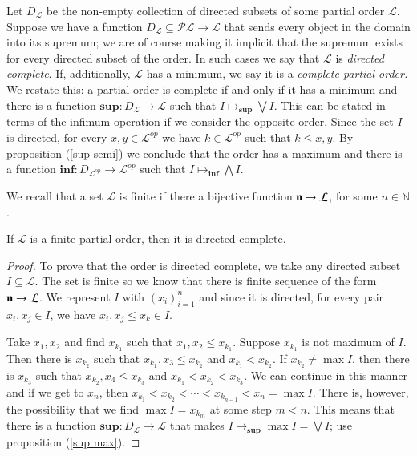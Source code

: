 \documentclass [12pt]{book}
\begin{document}
 Let $D_\mathcal L$ be the non-empty collection of directed subsets of some partial order $\mathcal L$. Suppose we have a function $D_\mathcal L\subseteq\mathcal{PL}\rightarrow\mathcal L$ that sends every object in the domain into its supremum; we are of course making it implicit that the supremum exists for every directed subset of the order. In such cases we say that $\mathcal L$ is \textit{directed complete}. If, additionally, $\mathcal L$ has a minimum, we say it is a \textit{complete partial order.} We restate this: a partial order is complete if and only if it has a minimum and there is a function $\textbf{sup}:D_\mathcal L\rightarrow\mathcal L$ such that $I \mapsto_\textbf{sup}\bigvee I$. This can be stated in terms of the infimum operation if we consider the opposite order. Since the set $I$ is directed, for every $x,y\in\mathcal L^{op}$ we have $k\in\mathcal L^{op}$ such that $k\leq x,y$. By proposition (\ref{sup semi}) we conclude that the order has a maximum and there is a function $\textbf{inf}:D_{\mathcal L^{op}}\rightarrow\mathcal L^{op}$ such that $I\mapsto_{\textbf{inf}}\bigwedge I$.

We recall that a set $\mathcal L$ is finite if there a bijective function $\textbf n\rightarrow\mathcal L$, for some $n\in\mathbb N$.

\begin{proposition}If $\mathcal L$ is a finite partial order, then it is directed complete.\end{proposition}

\begin{proof}To prove that the order is directed complete, we take any directed subset $I\subseteq\mathcal L$. The set is finite so we know that there is finite sequence of the form $\textbf n\rightarrow\mathcal L$. We represent $I$ with $(x_i)_{i=1}^n$ and since it is directed, for every pair $x_i,x_j\in I$, we have $x_i,x_j\leq x_k\in I$. 

Take $x_1,x_2$ and find $x_{k_1}$ such that $x_1,x_2\leq x_{k_1}$. Suppose $x_{k_1}$ is not maximum of $I$. Then there is $x_{k_2}$ such that $x_{k_1},x_3\leq x_{k_2}$ and $x_{k_1}<x_{k_2}$. If $x_{k_2}\neq\max I$, then there is $x_{k_3}$ such that $x_{k_2},x_4\leq x_{k_3}$ and $x_{k_1}<x_{k_2}<x_{k_3}$. We can continue in this manner and if we get to $x_n$, then $x_{k_1}<x_{k_2}<\cdots<x_{k_{n-1}}<x_n=\max I$. There is, however, the possibility that we find $\max I=x_{k_m}$ at some step $m<n$. This means that there is a function $\textbf{sup}:D_\mathcal L\rightarrow\mathcal L$ that makes $I\mapsto_\textbf{sup}\max I=\bigvee I$; use proposition (\ref{sup max}).\end{proof}
\end{document}
